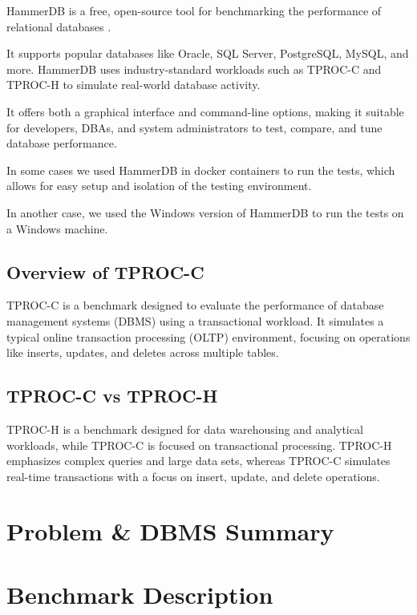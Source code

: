 HammerDB is a free, open-source tool for benchmarking the performance of relational databases \cite{enwiki:1275860580}.

It supports popular databases like Oracle, SQL Server, PostgreSQL, MySQL, and more. HammerDB uses industry-standard workloads such as TPROC-C and TPROC-H to simulate real-world database activity.

It offers both a graphical interface and command-line options, making it suitable for developers, DBAs, and system administrators to test, compare, and tune database performance.

In some cases we used HammerDB in docker containers to run the tests, which allows for easy setup and isolation of the testing environment.

In another case, we used the Windows version of HammerDB to run the tests on a Windows machine.

\subsection{Overview of TPROC-C}
\label{sec:tproc-c}

TPROC-C is a benchmark designed to evaluate the performance of database management systems (DBMS) using a transactional workload. It simulates a typical online transaction processing (OLTP) environment, focusing on operations like inserts, updates, and deletes across multiple tables.

\subsection{TPROC-C vs TPROC-H}
\label{sec:tproc-c-vs-tproc-h}

TPROC-H is a benchmark designed for data warehousing and analytical workloads, while TPROC-C is focused on transactional processing. TPROC-H emphasizes complex queries and large data sets, whereas TPROC-C simulates real-time transactions with a focus on insert, update, and delete operations.

\section{Problem \& DBMS Summary}
\label{sec:problem}

\section{Benchmark Description}
\label{sec:benchmark}

